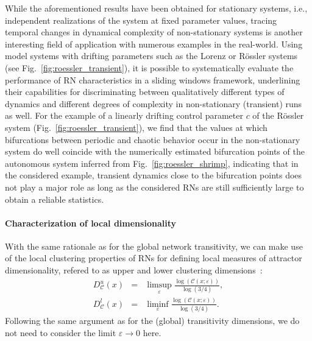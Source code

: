 While the aforementioned results have been obtained for stationary systems, i.e., independent realizations of the system at fixed parameter values, tracing temporal changes in dynamical complexity of non-stationary systems is another interesting field of application with numerous examples in the real-world. Using model systems with drifting parameters such as the Lorenz \cite{Donges2011NPG} or R\"ossler systems (see Fig.~\ref{fig:roessler_transient}), it is possible to systematically evaluate the performance of RN characteristics in a sliding windows framework, underlining their capabilities for discriminating between qualitatively different types of dynamics and different degrees of complexity in non-stationary (transient) runs as well. For the example of a linearly drifting control parameter $c$ of the R\"ossler system (Fig.~\ref{fig:roessler_transient}), we find that the values at which bifurcations between periodic and chaotic behavior occur in the non-stationary system do well coincide with the numerically estimated bifurcation points of the autonomous system inferred from Fig.~\ref{fig:roessler_shrimp}, indicating that in the considered example, transient dynamics close to the bifurcation points does not play a major role as long as the considered RNs are still sufficiently large to obtain a reliable statistics.

\paragraph{Characterization of local dimensionality}\label{sec:transitivity_local}

With the same rationale as for the global network transitivity, we can make use of the local clustering properties of RNs for defining local measures of attractor dimensionality, refered to as upper and lower clustering dimensions~\cite{Donner2011EPJB}:
\begin{eqnarray}
D_{\mathcal{C}}^u(x) &=& \limsup_{\varepsilon} \frac{\log(\mathcal{C}(x;\varepsilon))}{\log(3/4)}, \\
D_{\mathcal{C}}^l(x) &=& \liminf_{\varepsilon} \frac{\log(\mathcal{C}(x;\varepsilon))}{\log(3/4)}.
\end{eqnarray}
\noindent
Following the same argument as for the (global) transitivity dimensions, we do not need to consider the limit $\varepsilon\to 0$ here.

